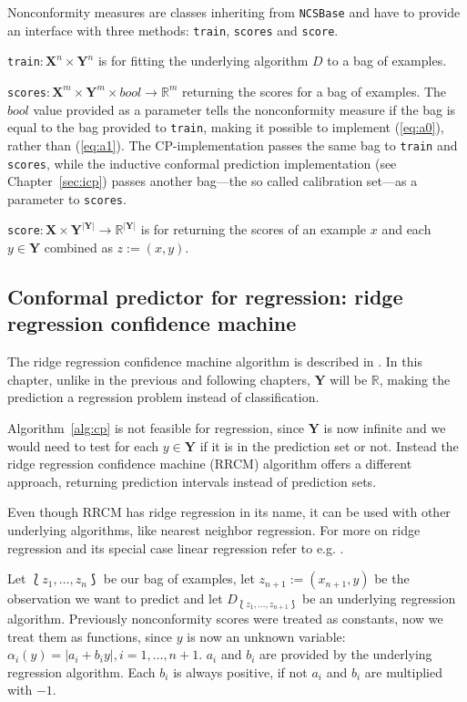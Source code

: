 \documentclass[twoside,11pt]{article}
\begin{document}
Nonconformity measures are classes inheriting from
\texttt{NCSBase} and have to provide an interface with
three methods: \texttt{train}, \texttt{scores} and
\texttt{score}.

\texttt{train}$: \textbf{X}^n \times \textbf{Y}^n$ is for
fitting the underlying algorithm $D$ to a bag of examples.

\texttt{scores}$: \textbf{X}^m \times \textbf{Y}^m \times
bool \rightarrow \mathbb{R}^m$ returning the scores for a
bag of examples. The $bool$ value provided as a parameter
tells the nonconformity measure if the bag is equal to the
bag provided to \texttt{train}, making it possible to
implement (\ref{eq:a0}), rather than (\ref{eq:a1}).
The CP-implementation passes the same bag to \texttt{train}
and \texttt{scores}, while the inductive conformal
prediction implementation (see Chapter~\ref{sec:icp})
passes another bag---the so called calibration set---as a
parameter to \texttt{scores}.

\texttt{score}$: \textbf{X} \times
\textbf{Y}^{|\textbf{Y}|} \rightarrow
\mathbb{R}^{|\textbf{Y}|}$ is for returning the scores of
an example $x$ and each $y \in \textbf{Y}$ combined as
$z := (x, y)$.

\subsection{Conformal predictor for regression: ridge
            regression confidence machine}
\label{subsec:rrcm}

The ridge regression confidence machine algorithm is
described in
\citet[Chapter 2.3]{nouretdinov_et_al_2001, alrw}.
In this chapter, unlike in the previous and following
chapters, $\textbf{Y}$ will be $\mathbb{R}$, making the
prediction a regression problem instead of classification.

Algorithm~\ref{alg:cp} is not feasible for regression,
since $\textbf{Y}$ is now infinite and we would need to
test for each $y \in \textbf{Y}$ if it is in the prediction
set or not. Instead the ridge regression confidence machine
(RRCM) algorithm offers a different approach, returning
prediction intervals instead of prediction sets.

Even though RRCM has ridge regression in its name, it can
be used with other underlying algorithms, like nearest
neighbor regression. For more on ridge regression and its
special case linear regression refer to e.g.
\citet[Chapter 3]{elem_stat}.

Let $\Lbag z_1,\dots,z_n \Rbag$ be our bag of examples,
let $z_{n+1} := (x_{n+1}, y)$ be the observation we want to
predict and let $D_{\Lbag z_1,\dots,z_{n+1} \Rbag}$ be an
underlying regression algorithm.
Previously nonconformity scores were treated as constants,
now we treat them as functions, since $y$ is now an unknown
variable: $\alpha_i(y) = |a_i + b_i y|, i=1,\dots,n+1$.
$a_i$ and $b_i$ are provided by the underlying regression
algorithm. Each $b_i$ is always positive, if not $a_i$ and
$b_i$ are multiplied with $-1$.
\end{document}
